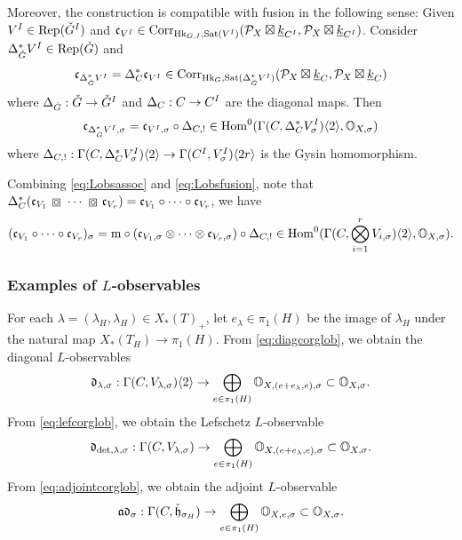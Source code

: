 \documentclass[reqno]{amsart}
\numberwithin{equation}{section}
\numberwithin{equation}{section}
\begin{document}
Moreover, the construction is compatible with fusion in the following sense: Given $V^I\in \operatorname{Rep}(\check{G}^I)$ and $\mathfrak{c}_{V^I}\in \mathrm{Corr}_{\operatorname{Hk}_{G,I},\operatorname{Sat}(V^I)}(\mathcal{P}_X\boxtimes\underline{k}_{C^I},\mathcal{P}_X\boxtimes\underline{k}_{C^I})$. Consider $\Delta^*_{\check{G}}V^I\in \operatorname{Rep}(\check{G})$ and \[\mathfrak{c}_{\Delta^*_{\check{G}}V^I}=\Delta_C^*\mathfrak{c}_{V^I}\in \mathrm{Corr}_{\operatorname{Hk}_{G},\operatorname{Sat}(\Delta^*_{\check{G}}V^I)}(\mathcal{P}_X\boxtimes\underline{k}_C,\mathcal{P}_X\boxtimes\underline{k}_C)\] where $\Delta_{\check{G}}:\check{G}\to \check{G}^I$ and $\Delta_C:C\to C^I$ are the diagonal maps. Then \begin{equation}\label{eq:Lobsfusion}
    \mathfrak{c}_{\Delta^*_{\check{G}}V^I,\sigma}=\mathfrak{c}_{V^I,\sigma}\circ \Delta_{C,!}\in \operatorname{Hom}^0(\Gamma(C,\Delta^*_{C}V^I_{\sigma})\langle 2\rangle , \mathbb{O}_{X,\sigma})
\end{equation} where $\Delta_{C,!}:\Gamma(C,\Delta^*_{C}V_{\sigma}^I)\langle 2\rangle \to \Gamma(C^I,V_{\sigma}^I)\langle 2r\rangle$ is the Gysin homomorphism.

Combining \eqref{eq:Lobsassoc} and \eqref{eq:Lobsfusion}, note that $\D_C^*(\frc_{V_1}\boxcirc \cdots \boxcirc \frc_{V_r})=\frc_{V_1} \circ \cdots \circ \frc_{V_r}$, we have \begin{equation}\label{eq:Lobsassocfusion}
    (\mathfrak{c}_{V_1}\circ \cdots \circ \mathfrak{c}_{V_r})_{\sigma}=\mathrm{m}\circ (\mathfrak{c}_{V_1,\sigma}\otimes \cdots \otimes \mathfrak{c}_{V_r,\sigma}) \circ \Delta_{C,!}\in \operatorname{Hom}^0(\Gamma(C,\bigotimes_{i=1}^r V_{i,\sigma})\langle 2\rangle , \mathbb{O}_{X,\sigma}).
\end{equation}




\subsubsection{Examples of \texorpdfstring{$L$}{L}-observables}


For each $\lambda=(\lambda_H,\lambda_H)\in X_*(T)_+$, let $e_{\lambda}\in\pi_1(H)$ be the image of $\lambda_H$ under the natural map $X_*(T_H)\to \pi_1(H)$. From \eqref{eq:diagcorglob}, we obtain the diagonal $L$-observables \begin{equation}\label{eq:diagLobs}
    \mathfrak{d}_{\lambda,\sigma}:\Gamma(C,V_{\lambda,\sigma})\langle 2\rangle\to \bigoplus_{e\in\pi_1(H)}\mathbb{O}_{X,(e+e_{\lambda},e),\sigma}\subset  \mathbb{O}_{X,\sigma}
.\end{equation} From \eqref{eq:lefcorglob}, we obtain the Lefschetz $L$-observable \begin{equation}\label{eq:lefLobs}
    \mathfrak{d}_{\det,\lambda,\sigma}:\Gamma(C,V_{\lambda,\sigma})\to \bigoplus_{e\in\pi_1(H)}\mathbb{O}_{X,(e+e_{\lambda},e),\sigma} \subset \mathbb{O}_{X,\sigma}.
\end{equation}
From \eqref{eq:adjointcorglob}, we obtain the adjoint $L$-observable \begin{equation}\label{eq:adjointLobs}
    \mathfrak{a}\mathfrak{d}_{\sigma}:\Gamma(C,\check{\mathfrak{h}}_{\sigma_H})\to \bigoplus_{e\in\pi_1(H)}\mathbb{O}_{X,e,\sigma} \subset \mathbb{O}_{X,\sigma}.
\end{equation}
\end{document}

